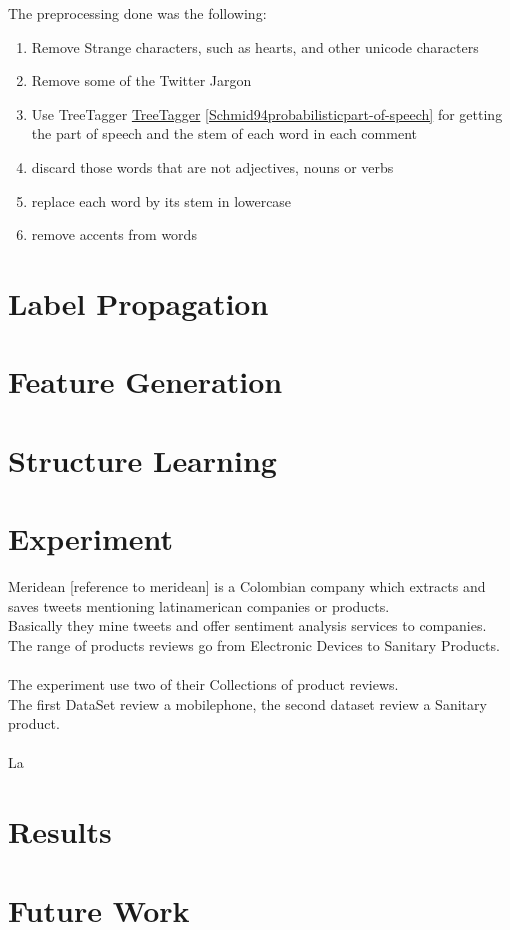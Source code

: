 \documentclass[4pt,a4paper,twocolumn]{article}
\begin{document}
The preprocessing done was the following:
\begin{enumerate}
	\item Remove Strange characters, such as hearts, and other unicode characters
	\item Remove some of the Twitter Jargon 
	\item Use TreeTagger \href{http://www.ims.uni-stuttgart.de/projekte/corplex/TreeTagger/}{TreeTagger} \ref{Schmid94probabilisticpart-of-speech} for getting the part of speech and the stem of each word in each comment
	\item discard those words that are not adjectives, nouns or verbs
	\item replace each word by its stem in lowercase
	\item remove accents from words
\end{enumerate}

\part*{Label Propagation}


\part*{Feature Generation}
\part*{Structure Learning}

\part*{Experiment}
Meridean [reference to meridean] is a Colombian company which extracts and saves tweets
mentioning latinamerican companies or products.\\
Basically they mine  tweets and offer sentiment analysis services to companies.\\
The range of products reviews go from Electronic Devices to Sanitary Products.\\
\\
The experiment use two of their Collections of product reviews.\\
The first DataSet review a mobilephone, the second dataset review a Sanitary product.\\
\\
La

\part*{Results}

\part*{Future Work}



 
\end{document}
